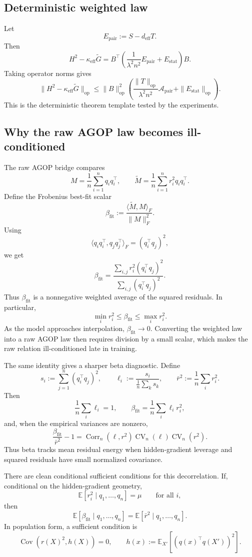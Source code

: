 \subsection{Deterministic weighted law}

Let
\[
E_{\mathrm{pair}}:=S-d_{\mathrm{eff}}T.
\]
Then
\[
H^2-\kappa_{\mathrm{eff}}\widetilde G
=
B^\top
\left(
\frac{1}{\lambda^2 n^2}E_{\mathrm{pair}}
+
E_{\mathrm{stat}}
\right)B.
\]
Taking operator norms gives
\[
\|H^2-\kappa_{\mathrm{eff}}\widetilde G\|_{\mathrm{op}}
\le
\|B\|_{\mathrm{op}}^2
\left(
\frac{\|T\|_{\mathrm{op}}}{\lambda^2 n^2}
\mathcal A_{\mathrm{pair}}
+
\|E_{\mathrm{stat}}\|_{\mathrm{op}}
\right).
\]
This is the deterministic theorem template tested by the experiments.

\subsection{Why the raw AGOP law becomes ill-conditioned}

The raw AGOP bridge compares
\[
M=\frac1n\sum_{i=1}^n q_iq_i^\top,
\qquad
\widetilde M=\frac1n\sum_{i=1}^n r_i^2q_iq_i^\top.
\]
Define the Frobenius best-fit scalar
\[
\beta_{\mathrm{fit}}
:=
\frac{\langle \widetilde M,M\rangle_F}{\|M\|_F^2}.
\]
Using
\[
\langle q_iq_i^\top,q_jq_j^\top\rangle_F
=
(q_i^\top q_j)^2,
\]
we get
\[
\beta_{\mathrm{fit}}
=
\frac{
\sum_{i,j} r_i^2(q_i^\top q_j)^2
}{
\sum_{i,j}(q_i^\top q_j)^2
}.
\]
Thus \(\beta_{\mathrm{fit}}\) is a nonnegative weighted average of the squared
residuals. In particular,
\[
\min_i r_i^2
\le
\beta_{\mathrm{fit}}
\le
\max_i r_i^2.
\]
As the model approaches interpolation, \(\beta_{\mathrm{fit}}\to 0\). Converting
the weighted law into a raw AGOP law then requires division by a small scalar,
which makes the raw relation ill-conditioned late in training.

The same identity gives a sharper beta diagnostic. Define
\[
s_i:=\sum_{j=1}^n(q_i^\top q_j)^2,
\qquad
\ell_i:=\frac{s_i}{\frac1n\sum_k s_k},
\qquad
\bar r^2:=\frac1n\sum_i r_i^2.
\]
Then
\[
\frac1n\sum_i\ell_i=1,
\qquad
\beta_{\mathrm{fit}}=\frac1n\sum_i\ell_i r_i^2,
\]
and, when the empirical variances are nonzero,
\[
\frac{\beta_{\mathrm{fit}}}{\bar r^2}-1
=
\operatorname{Corr}_n(\ell,r^2)
\operatorname{CV}_n(\ell)
\operatorname{CV}_n(r^2).
\]
Thus beta tracks mean residual energy when hidden-gradient leverage and squared
residuals have small normalized covariance.

There are clean conditional sufficient conditions for this decorrelation. If,
conditional on the hidden-gradient geometry,
\[
\mathbb E[r_i^2\mid q_1,\ldots,q_n]=\mu
\qquad
\text{for all }i,
\]
then
\[
\mathbb E[\beta_{\mathrm{fit}}\mid q_1,\ldots,q_n]
=
\mathbb E[\bar r^2\mid q_1,\ldots,q_n].
\]
In population form, a sufficient condition is
\[
\operatorname{Cov}(r(X)^2,h(X))=0,
\qquad
h(x):=\mathbb E_{X'}[(q(x)^\top q(X'))^2].
\]

